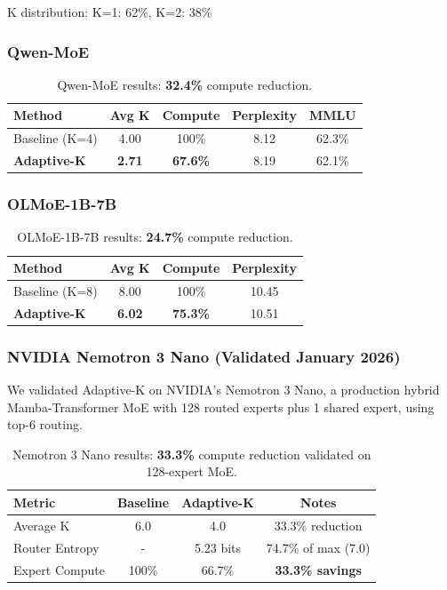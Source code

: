 \documentclass{article}
\begin{document}
K distribution: K=1: 62\%, K=2: 38\%

\subsubsection{Qwen-MoE}

\begin{table}[h]
\centering
\begin{tabular}{lcccc}
\toprule
\textbf{Method} & \textbf{Avg K} & \textbf{Compute} & \textbf{Perplexity} & \textbf{MMLU} \\
\midrule
Baseline (K=4) & 4.00 & 100\% & 8.12 & 62.3\% \\
\textbf{Adaptive-K} & \textbf{2.71} & \textbf{67.6\%} & 8.19 & 62.1\% \\
\bottomrule
\end{tabular}
\caption{Qwen-MoE results: \textbf{32.4\%} compute reduction.}
\label{tab:qwen}
\end{table}

\subsubsection{OLMoE-1B-7B}

\begin{table}[h]
\centering
\begin{tabular}{lccc}
\toprule
\textbf{Method} & \textbf{Avg K} & \textbf{Compute} & \textbf{Perplexity} \\
\midrule
Baseline (K=8) & 8.00 & 100\% & 10.45 \\
\textbf{Adaptive-K} & \textbf{6.02} & \textbf{75.3\%} & 10.51 \\
\bottomrule
\end{tabular}
\caption{OLMoE-1B-7B results: \textbf{24.7\%} compute reduction.}
\label{tab:olmoe}
\end{table}

\subsubsection{NVIDIA Nemotron 3 Nano (Validated January 2026)}

We validated Adaptive-K on NVIDIA's Nemotron 3 Nano, a production hybrid Mamba-Transformer MoE with 128 routed experts plus 1 shared expert, using top-6 routing.

\begin{table}[h]
\centering
\begin{tabular}{lccc}
\toprule
\textbf{Metric} & \textbf{Baseline} & \textbf{Adaptive-K} & \textbf{Notes} \\
\midrule
Average K & 6.0 & 4.0 & 33.3\% reduction \\
Router Entropy & - & 5.23 bits & 74.7\% of max (7.0) \\
Expert Compute & 100\% & 66.7\% & \textbf{33.3\% savings} \\
\bottomrule
\end{tabular}
\caption{Nemotron 3 Nano results: \textbf{33.3\%} compute reduction validated on 128-expert MoE.}
\label{tab:nemotron}
\end{table}
\end{document}
